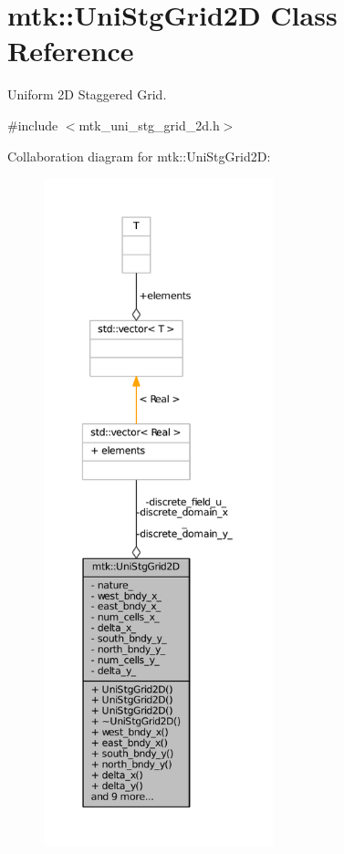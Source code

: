 \hypertarget{classmtk_1_1UniStgGrid2D}{\section{mtk\-:\-:Uni\-Stg\-Grid2\-D Class Reference}
\label{classmtk_1_1UniStgGrid2D}
}


Uniform 2\-D Staggered Grid.  




{\ttfamily \#include $<$mtk\-\_\-uni\-\_\-stg\-\_\-grid\-\_\-2d.\-h$>$}



Collaboration diagram for mtk\-:\-:Uni\-Stg\-Grid2\-D\-:
\nopagebreak
\begin{figure}[H]
\begin{center}
\leavevmode
\includegraphics[height=550pt]{classmtk_1_1UniStgGrid2D__coll__graph}
\end{center}
\end{figure}
